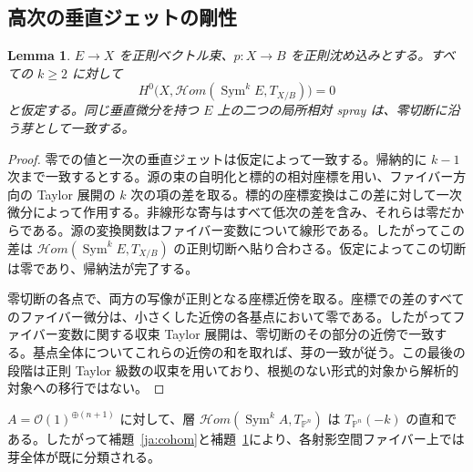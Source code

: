\documentclass[12pt]{amsart}
\newtheorem{lem}[thm]{Lemma}
\theoremstyle{definition}
\theoremstyle{remark}
\numberwithin{equation}{section}
\newcommand{\Hom}{\mathscr{H}\!\mathit{om}}
\newcommand{\cO}{\mathcal{O}}
\DeclareMathOperator{\Sym}{Sym}
\newcommand{\mP}{\mathbb{P}}
\begin{document}
\subsection{高次の垂直ジェットの剛性}
\begin{lem}\label{ja:jets}
$E\to X$ を正則ベクトル束、$p:X\to B$ を正則沈め込みとする。すべての $k\geq2$ に対して
\[
H^0\bigl(X,\Hom(\Sym^k E,T_{X/B})\bigr)=0
\]
と仮定する。同じ垂直微分を持つ $E$ 上の二つの局所相対 spray は、零切断に沿う芽として一致する。
\end{lem}
\begin{proof}
零での値と一次の垂直ジェットは仮定によって一致する。帰納的に $k-1$ 次まで一致するとする。源の束の自明化と標的の相対座標を用い、ファイバー方向の Taylor 展開の $k$ 次の項の差を取る。標的の座標変換はこの差に対して一次微分によって作用する。非線形な寄与はすべて低次の差を含み、それらは零だからである。源の変換関数はファイバー変数について線形である。したがってこの差は $\Hom(\Sym^k E,T_{X/B})$ の正則切断へ貼り合わさる。仮定によってこの切断は零であり、帰納法が完了する。

零切断の各点で、両方の写像が正則となる座標近傍を取る。座標での差のすべてのファイバー微分は、小さくした近傍の各基点において零である。したがってファイバー変数に関する収束 Taylor 展開は、零切断のその部分の近傍で一致する。基点全体についてこれらの近傍の和を取れば、芽の一致が従う。この最後の段階は正則 Taylor 級数の収束を用いており、根拠のない形式的対象から解析的対象への移行ではない。
\end{proof}

$A=\cO(1)^{\oplus(n+1)}$ に対して、層 $\Hom(\Sym^k A,T_{\mP^n})$ は $T_{\mP^n}(-k)$ の直和である。したがって補題~\ref{ja:cohom}と補題~\ref{ja:jets}により、各射影空間ファイバー上では芽全体が既に分類される。
\end{document}
